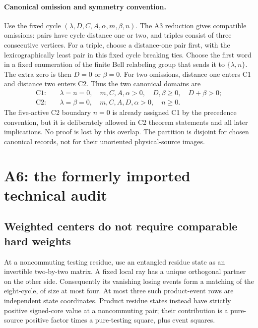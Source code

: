 \paragraph{Canonical omission and symmetry convention.}
Use the fixed cycle
$(\lambda,D,C,A,\alpha,m,\beta,n)$.
The A3 reduction gives compatible omissions: pairs have cycle distance
one or two, and triples consist of three consecutive vertices.
For a triple, choose a distance-one pair first, with the lexicographically
least pair in this fixed cycle breaking ties. Choose the first word in
a fixed enumeration of the finite Bell relabeling group that sends it
to $\{\lambda,n\}$. The extra zero is then $D=0$ or $\beta=0$.
For two omissions, distance one enters C1 and distance two enters C2.
Thus the two canonical domains are
\begin{align*}
\mathrm{C1}:&\quad \lambda=n=0,\quad m,C,A,\alpha>0,\quad
 D,\beta\ge0,\quad D+\beta>0;\\
\mathrm{C2}:&\quad \lambda=\beta=0,\quad m,C,A,D,\alpha>0,
 \quad n\ge0.
\end{align*}
The five-active C2 boundary $n=0$ is already assigned C1 by the
precedence convention, but it is deliberately allowed in C2 theorem
statements and all later implications. No proof is lost by this overlap.
The partition is disjoint for chosen canonical records, not for their
unoriented physical-source images.

\section{A6: the formerly imported technical audit}

\subsection{Weighted centers do not require comparable hard weights}

At a noncommuting testing residue, use an entangled residue state as an
invertible two-by-two matrix. A fixed local ray has a unique orthogonal
partner on the other side. Consequently its vanishing losing events
form a matching of the eight-cycle, of size at most four. At most three
such product-event rows are independent state coordinates. Product
residue states instead have strictly positive signed-core value at a
noncommuting pair; their contribution is a pure-source positive factor
times a pure-testing square, plus event squares.

